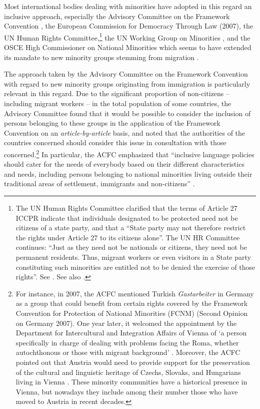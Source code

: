 \documentclass[output=paper,colorlinks,citecolor=brown]{langscibook}
\begin{document}
Most international bodies dealing with minorities have adopted in this regard an inclusive approach, especially the Advisory Committee on the Framework Convention \citep{acfc2016,acfc2001c,acfc2002a,acfc2002b}, the European Commission for Democracy Through Law (2007), the UN Human Rights Committee,\footnote{The UN Human Rights Committee clarified that the terms of Article 27 ICCPR indicate that individuals designated to be protected need not be citizens of a state party, and that a ``State party may not therefore restrict the rights under Article 27 to its citizens alone''. The UN HR Committee continues: ``Just as they need not be nationals or citizens, they need not be permanent residents. Thus, migrant workers or even visitors in a State party constituting such minorities are entitled not to be denied the exercise of those rights''. See \citet{UNHRC1994}. See also \citet{UN HRC1981}.} the UN Working Group on Minorities \citep{eide2000}, and the OSCE High Commissioner on National Minorities which seems to have extended its mandate to new minority groups stemming from migration \citep{osce2004,osce_hcnm2006,ekeus2006,osce_hcnm2012}.

The approach taken by the Advisory Committee on the Framework Convention with regard to new minority groups originating from immigration is particularly relevant in this regard. Due to the significant proportion of non-citizens – including migrant workers – in the total population of some countries, the Advisory Committee found that it would be possible to consider the inclusion of persons belonging to these groups in the application of the Framework Convention on an \textit{article-by-article} basis, and noted that the authorities of the countries concerned should consider this issue in consultation with those concerned.\footnote{For instance, in 2007, the ACFC mentioned Turkish \textit{Gastarbeiter} in Germany as a group that could benefit from certain rights covered by the Framework Convention for Protection of National Minorities (FCNM) (Second Opinion on Germany 2007). One year later, it welcomed the appointment by the Department for Intercultural and Integration Affairs of Vienna of `a person specifically in charge of dealing with problems facing the Roma, whether autochthonous or those with migrant background' \citep{acfc2008}. Moreover, the ACFC pointed out that Austria would need to provide support for the preservation of the cultural and linguistic heritage of Czechs, Slovaks, and Hungarians living in Vienna \citep{acfc2008}. These minority communities have a historical presence in Vienna, but nowadays they include among their number those who have moved to Austria in recent decades.} In particular, the ACFC emphasized that ``inclusive language policies should cater for the needs of everybody based on their different characteristics and needs, including persons belonging to national minorities living outside their traditional areas of settlement, immigrants and non-citizens'' \citep[24]{acfc2016}. 
\end{document}
